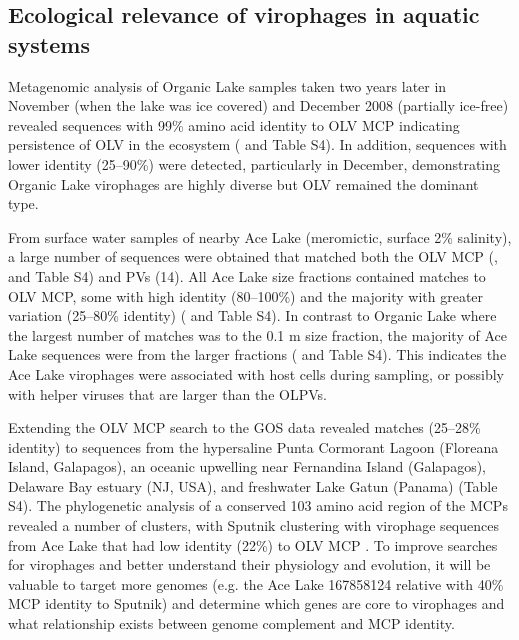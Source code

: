 \subsection{Ecological relevance of virophages in aquatic systems}
Metagenomic analysis of Organic Lake samples taken two years later in November (when the lake was ice covered) and December 2008 (partially ice-free) revealed sequences with 99\% amino acid identity to \ac{OLV} \ac{MCP} indicating persistence of \ac{OLV} in the ecosystem ( and Table S4). 
In addition, sequences with lower identity (25--90\%) were detected, particularly in December, demonstrating Organic Lake virophages are highly diverse but \ac{OLV} remained the dominant type. 

From surface water samples of nearby Ace Lake (meromictic, surface 2\% salinity), a large number of sequences were obtained that matched both the \ac{OLV} \ac{MCP} (,  and Table S4) and \acp{PV} (14). 
All Ace Lake size fractions contained matches to \ac{OLV} \ac{MCP}, some with high identity (80--100\%) and the majority with greater variation (25--80\% identity) ( and Table S4). 
In contrast to Organic Lake where the largest number of matches was to the 0.1 \textmu{}m size fraction, the majority of Ace Lake sequences were from the larger fractions ( and Table S4). 
This indicates the Ace Lake virophages were associated with host cells during sampling, or possibly with helper viruses that are larger than the \acp{OLPV}. 


Extending the \ac{OLV} \ac{MCP} search to the \ac{GOS} data revealed matches (25--28\% identity) to sequences from the hypersaline Punta Cormorant Lagoon (Floreana Island, Galapagos), an oceanic upwelling near Fernandina Island (Galapagos), Delaware Bay estuary (\textsc{NJ}, \textsc{USA}), and freshwater Lake Gatun (Panama) (Table S4). 
The phylogenetic analysis of a conserved 103 amino acid region of the \acp{MCP} revealed a number of clusters, with Sputnik clustering with virophage sequences from Ace Lake that had low identity (22\%) to \ac{OLV} \ac{MCP} . 
To improve searches for virophages and better understand their physiology and evolution, it will be valuable to target more genomes (e.g. the Ace Lake 167858124 relative with 40\% MCP identity to Sputnik) and determine which genes are core to virophages and what relationship exists between genome complement and \ac{MCP} identity.
 
